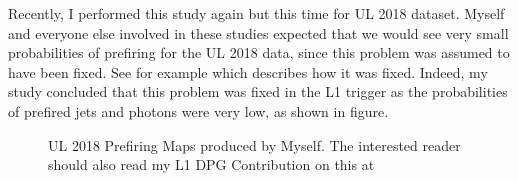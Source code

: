 Recently, I performed this study again but this time for UL 2018 dataset. Myself and everyone else involved in these studies expected that we would see very small probabilities of prefiring for the UL 2018 data, since this problem was assumed to have been fixed. See for example \cite{Nick_Thomas} which describes how it was fixed. Indeed, my study concluded that this problem was fixed in the L1 trigger as the probabilities of prefired jets and photons were very low, as shown in figure. 
\begin{figure}[h]%
    \centering
    \qquad
    \caption{UL 2018 Prefiring Maps produced by Myself. The interested reader should also read my L1 DPG Contribution on this at \cite{UL2018}}%
    \label{UL_2018}%
\end{figure}

